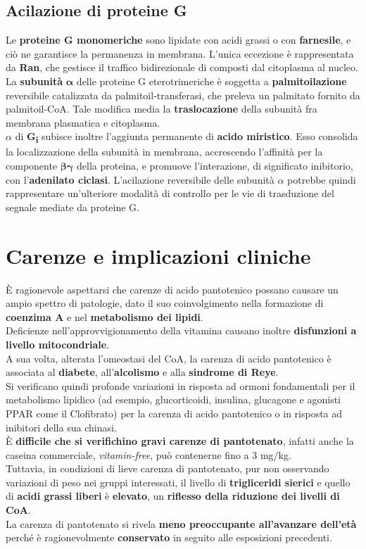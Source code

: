 \documentclass[a4paper, 12pt]{article}
\begin{document}
\subsection{Acilazione di proteine G}
Le \textbf{proteine G monomeriche} sono lipidate con acidi grassi o con \textbf{farnesile}, e ciò ne garantisce la permanenza in membrana. L'unica eccezione è rappresentata da \textbf{Ran}, che gestisce il traffico bidirezionale di composti dal citoplasma al nucleo.\\
La \textbf{subunità} $\boldsymbol\alpha$ delle proteine G eterotrimeriche è soggetta a \textbf{palmitoilazione} reversibile catalizzata da palmitoil-transferasi, che preleva un palmitato fornito da palmitoil-CoA. Tale modifica media la \textbf{traslocazione} della subunità fra membrana plasmatica e citoplasma.\\
$\alpha$ di \textbf{G\textsubscript{i}} subisce inoltre l'aggiunta permanente di \textbf{acido miristico}. Esso consolida la localizzazione della subunità in membrana, accrescendo l'affinità per la componente $\boldsymbol{\beta\gamma}$ della proteina, e promuove l'interazione, di significato inibitorio, con l'\textbf{adenilato ciclasi}.
L'acilazione reversibile delle subunità $\alpha$ potrebbe quindi rappresentare un'ulteriore modalità di controllo per le vie di trasduzione del segnale mediate da proteine G.

\section{Carenze e implicazioni cliniche}
È ragionevole aspettarsi che carenze di acido pantotenico possano causare un ampio spettro di patologie, dato il suo coinvolgimento nella formazione di \textbf{coenzima A} e nel \textbf{metabolismo dei lipidi}.\\
Deficienze nell'approvvigionamento della vitamina causano inoltre \textbf{disfunzioni a livello mitocondriale}.\\
A sua volta, alterata l’omeostasi del CoA, la carenza di acido pantotenico è associata al \textbf{diabete}, all’\textbf{alcolismo} e alla \textbf{sindrome di Reye}.\\
Si verificano quindi profonde variazioni in risposta ad ormoni fondamentali per il metabolismo lipidico (ad esempio, glucorticoidi, insulina, glucagone e agonisti PPAR come il Clofibrato) per la carenza di acido pantotenico o in risposta ad inibitori della sua chinasi.\\
È \textbf{difficile che si verifichino gravi carenze di pantotenato}, infatti anche la caseina commerciale, \textit{vitamin-free}, può contenerne fino a 3 mg/kg.\\
Tuttavia, in condizioni di lieve carenza di pantotenato, pur non osservando variazioni di peso nei gruppi interessati, il livello di \textbf{trigliceridi sierici} e quello di \textbf{acidi grassi liberi} è \textbf{elevato}, un \textbf{riflesso della riduzione dei livelli di CoA}.\\
La carenza di pantotenato si rivela \textbf{meno preoccupante all’avanzare dell’età} perché è ragionevolmente \textbf{conservato} in seguito alle esposizioni precedenti.
\end{document}

